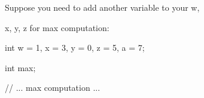 Suppose you need to add another variable to your w,

x, y, z for max computation:

\begin{console}

int w = 1, x = 3, y = 0, z = 5, a = 7;

int max;



// ... max computation ... 

\end{console}

